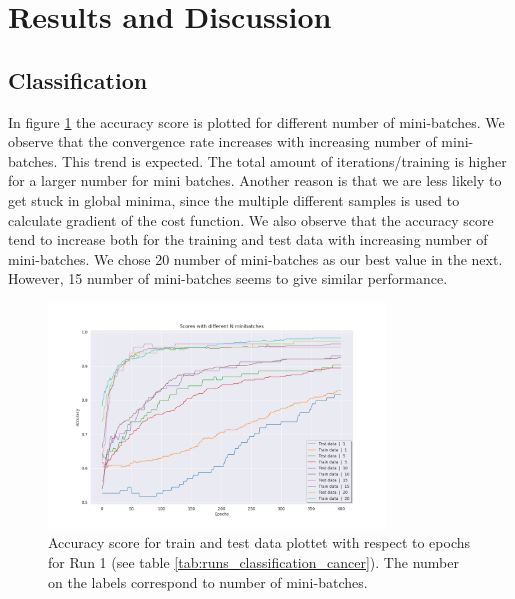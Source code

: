 \section{Results and Discussion}




\subsection{Classification}


%                              


In figure \ref{fig:d_line_batch_size} the accuracy score is plotted for
different number of mini-batches. We observe that the convergence rate
increases with increasing number of mini-batches. This trend is expected. The
total amount of iterations/training is higher for a larger number for
mini batches. Another reason is that we are less likely to get stuck in global
minima, since the multiple different samples is used to calculate gradient of the
cost function. We also observe that the accuracy score tend to increase both
for the training and test data with increasing number of mini-batches.
We chose 20 number of mini-batches as our best value in the next. However, 15
number of mini-batches seems to give similar performance.    


\begin{figure}[H]
    \centering
    \includegraphics[width=0.8\textwidth]{Figures/PartD/d_line_batch_size.png}
    \caption{Accuracy score for train and test data plottet with respect to epochs for Run 1 (see table
    \ref{tab:runs_classification_cancer}). The number on the labels correspond
to number of mini-batches.}  
    \label{fig:d_line_batch_size} 
\end{figure}


